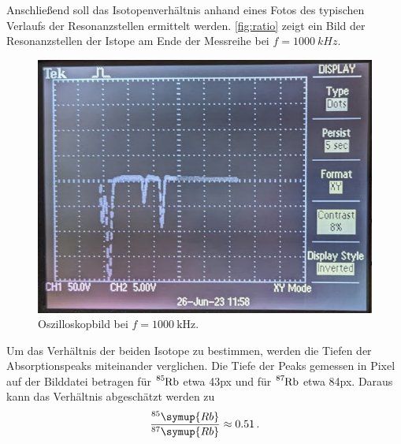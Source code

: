 Anschließend soll das Isotopenverhältnis anhand eines Fotos des typischen Verlaufs der Resonanzstellen ermittelt werden.
\autoref{fig:ratio} zeigt ein Bild der Resonanzstellen der Istope am Ende der Messreihe bei $f = \qty{1000}{kHz}$.
\begin{figure}
    \centering
    \includegraphics[width = 0.8\linewidth]{pictures/ratio.png}
    \caption{Oszilloskopbild bei $f=\qty{1000}{\kilo\hertz}$.}
    \label{fig:ratio}
\end{figure}
Um das Verhältnis der beiden Isotope zu bestimmen, werden die Tiefen der Absorptionspeaks miteinander verglichen.
Die Tiefe der Peaks gemessen in Pixel auf der Bilddatei betragen für $\ce{^{85}_{}Rb}$ etwa 43px
und für $\ce{^{87}_{}Rb}$ etwa 84px.
Daraus kann das Verhältnis abgeschätzt werden zu
\begin{equation*}
    \frac{^{85}\symup{Rb}}{^{87}\symup{Rb}} \approx 0.51 \, .
\end{equation*}

